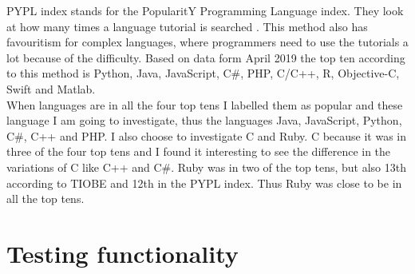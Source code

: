 PYPL index stands for the PopularitY Programming Language index. They look at how many times a language tutorial is searched \cite{car:2019}. This method also has favouritism for complex languages, where programmers need to use the tutorials a lot because of the difficulty. Based on data form April 2019 the top ten according to this method is Python, Java, JavaScript, C\#, PHP, C/C++, R, Objective-C, Swift and Matlab.\\

When languages are in all the four top tens I labelled them as popular and these language I am going to investigate, thus the languages Java, JavaScript, Python, C\#, C++ and PHP. I also choose to investigate C and Ruby. C because it was in three of the four top tens and I found it interesting to see the difference in the variations of C like C++ and C\#. Ruby was in two of the top tens, but also 13th according to TIOBE and 12th in the PYPL index. Thus Ruby was close to be in all the top tens.


\section{Testing functionality}

